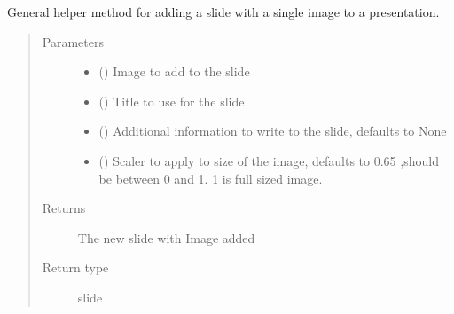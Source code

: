 \documentclass[letterpaper,10pt,english]{sphinxmanual}
\begin{document}
\begin{fulllineitems}
\begin{fulllineitems}
\label{\detokenize{polo.utils:polo.utils.io_utils.PptxWriter.add_single_image_slide}}
General helper method for adding a slide with a single image to a
presentation.
\begin{quote}\begin{description}
\item[{Parameters}] \leavevmode\begin{itemize}
\item {} 
 ({\hyperref[\detokenize{polo.crystallography:polo.crystallography.image.Image}]{}}) \textendash{} Image to add to the slide

\item {} 
 () \textendash{} Title to use for the slide

\item {} 
 (\sphinxstyleliteralemphasis{\sphinxupquote{, }}) \textendash{} Additional information to write to the slide, defaults to None

\item {} 
 (\sphinxstyleliteralemphasis{\sphinxupquote{, }}) \textendash{} Scaler to apply to size of the image, defaults to 0.65
,should be between 0 and 1. 1 is full sized image.

\end{itemize}

\item[{Returns}] \leavevmode
The new slide with Image added

\item[{Return type}] \leavevmode
slide

\end{description}\end{quote}


\end{fulllineitems}
\end{fulllineitems}
\end{document}
